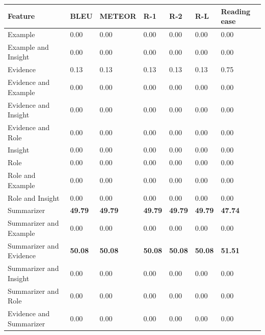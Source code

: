 \begin{tabular}{|l|l|l|l|l|l|l|}
\hline
\textbf{Feature} & BLEU & METEOR & R-1 & R-2 & R-L & Reading ease \\
 \hline
 Example & 0.00 & 0.00 & 0.00 & 0.00 & 0.00 & 0.00 \\
 \hline
 Example and Insight & 0.00 & 0.00 & 0.00 & 0.00 & 0.00 & 0.00 \\
 \hline
 Evidence & 0.13 & 0.13 & 0.13 & 0.13 & 0.13 & 0.75 \\
 \hline
 Evidence and Example & 0.00 & 0.00 & 0.00 & 0.00 & 0.00 & 0.00 \\
 \hline
 Evidence and Insight & 0.00 & 0.00 & 0.00 & 0.00 & 0.00 & 0.00 \\
 \hline
 Evidence and Role & 0.00 & 0.00 & 0.00 & 0.00 & 0.00 & 0.00 \\
 \hline
 Insight & 0.00 & 0.00 & 0.00 & 0.00 & 0.00 & 0.00 \\
 \hline
 Role & 0.00 & 0.00 & 0.00 & 0.00 & 0.00 & 0.00 \\
 \hline
 Role and Example & 0.00 & 0.00 & 0.00 & 0.00 & 0.00 & 0.00 \\
 \hline
 Role and Insight & 0.00 & 0.00 & 0.00 & 0.00 & 0.00 & 0.00 \\
 \hline
 Summarizer & \textbf{49.79} & \textbf{49.79} & \textbf{49.79} & \textbf{49.79} & \textbf{49.79} & \textbf{47.74} \\
 \hline
 Summarizer and Example & 0.00 & 0.00 & 0.00 & 0.00 & 0.00 & 0.00 \\
 \hline
 Summarizer and Evidence & \textbf{50.08} & \textbf{50.08} & \textbf{50.08} & \textbf{50.08} & \textbf{50.08} & \textbf{51.51} \\
 \hline
 Summarizer and Insight & 0.00 & 0.00 & 0.00 & 0.00 & 0.00 & 0.00 \\
 \hline
 Summarizer and Role & 0.00 & 0.00 & 0.00 & 0.00 & 0.00 & 0.00 \\
 \hline
 Evidence and Summarizer & 0.00 & 0.00 & 0.00 & 0.00 & 0.00 & 0.00 \\
\hline
\end{tabular}
